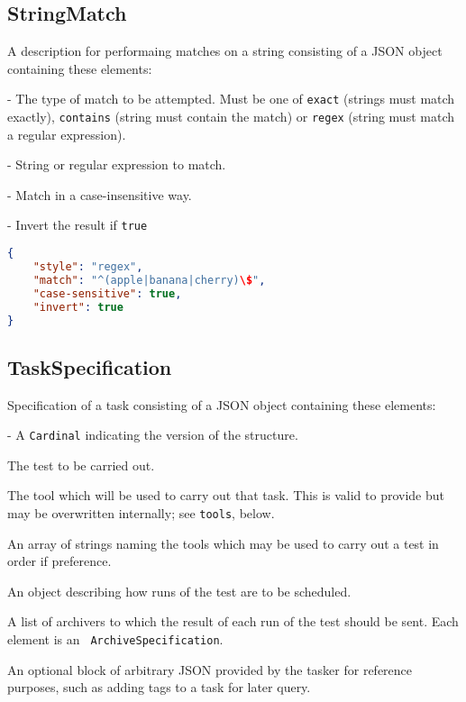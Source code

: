 \documentclass[10pt]{article}
\begin{document}
\subsection{StringMatch}
A description for performaing matches on a string consisting of a JSON
object containing these elements:

 - The type of match to be attempted.  Must
be one of {\tt exact} (strings must match exactly), {\tt contains}
(string must contain the match) or {\tt regex} (string must match a
regular expression).

 - String or regular expression to match.

 - Match in a case-insensitive
way.

 - Invert the result if {\tt true}

\example
\begin{lstlisting}[language=json]
{
    "style": "regex",
    "match": "^(apple|banana|cherry)\$",
    "case-sensitive": true,
    "invert": true
}
\end{lstlisting}



\subsection{TaskSpecification}
Specification of a task consisting of a JSON object containing these
elements:

 - A {\tt Cardinal} indicating the version
of the structure.

 The test to be carried out.

 The tool which will be used to carry out that
task.  This is valid to provide but may be overwritten internally; see
{\tt tools}, below.

 An array of strings naming the tools which
may be used to carry out a test in order if preference.

 An object describing how
runs of the test are to be scheduled.

 A list of archivers to which the result of
each run of the test should be sent.  Each element is an {\tt
  ArchiveSpecification}.

 An optional block of arbitrary JSON
provided by the tasker for reference purposes, such as adding tags to
a task for later query.
\end{document}
